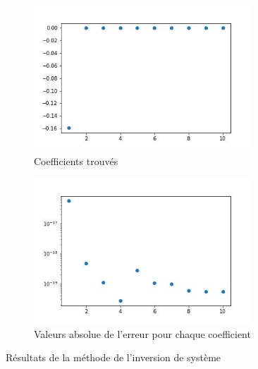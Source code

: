 \documentclass[12pt]{report}
\begin{document}
\begin{figure}
    \centering
    \begin{subfigure}[b]{0.4\textwidth}
        \centering
        \includegraphics[width=0.9\textwidth, height=0.9\textwidth]{coefs_1_inv.jpg}
        \caption{Coefficients trouvés}
    \end{subfigure}
    \hfill
    \begin{subfigure}[b]{0.4\textwidth}
        \centering
        \includegraphics[width=0.9\textwidth, height=0.9\textwidth]{coefs_1_inv_erreur.jpg}
        \caption{Valeurs absolue de l'erreur pour chaque coefficient}
    \end{subfigure}
       \caption{Résultats de la méthode de l'inversion de système}
       \label{fig:résultats 1 inv}
\end{figure}
\end{document}
